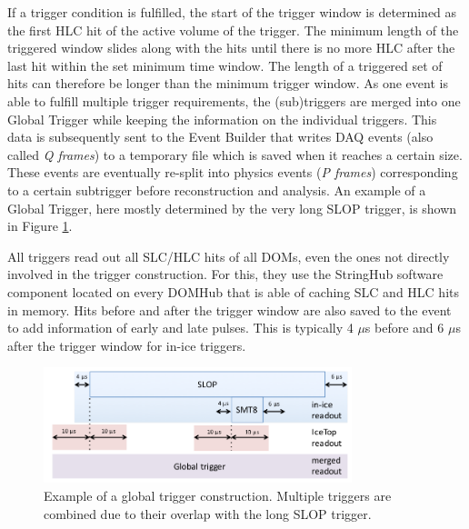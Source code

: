 \noindent If a trigger condition is fulfilled, the start of the trigger window is determined as the first HLC hit of the active volume of the trigger. The minimum length of the triggered window slides along with the hits until there is no more HLC after the last hit within the set minimum time window. The length of a triggered set of hits can therefore be longer than the minimum trigger window. As one event is able to fulfill multiple trigger requirements, the (sub)triggers are merged into one Global Trigger while keeping the information on the individual triggers. This data is subsequently sent to the Event Builder that writes DAQ events (also called \textit{Q frames}) to a temporary file which is saved when it reaches a certain size. These events are eventually re-split into physics events (\textit{P frames}) corresponding to a certain subtrigger before reconstruction and analysis. An example of a Global Trigger, here mostly determined by the very long SLOP trigger, is shown in Figure \ref{fig:globaltrigger}.

All triggers read out all SLC/HLC hits of all DOMs, even the ones not directly involved in the trigger construction. For this, they use the StringHub software component located on every DOMHub that is able of caching SLC and HLC hits in memory. Hits before and after the trigger window are also saved to the event to add information of early and late pulses. This is typically 4 $\mu$s before and 6 $\mu$s after the trigger window for in-ice triggers. 




\begin{figure}[t]
\centering
\includegraphics[width=0.8\textwidth]{chapter5/img/globaltrigger.png}
\caption{Example of a global trigger construction. Multiple triggers are combined due to their overlap with the long SLOP trigger.}
\label{fig:globaltrigger}
\end{figure}


